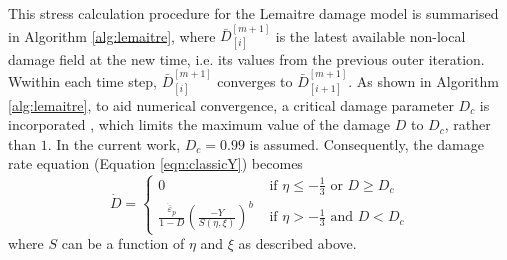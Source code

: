 \documentclass[sn-mathphys,Numbered]{sn-jnl}%
\begin{document}




This stress calculation procedure for the Lemaitre damage model is summarised in Algorithm \ref{alg:lemaitre}, where $\bar{D}^{[m+1]}_{[i]}$ is the latest available non-local damage field at the new time, i.e. its values from the previous outer iteration.
Wwithin each time step, $\bar{D}^{[m+1]}_{[i]}$ converges to $\bar{D}^{[m+1]}_{[i+1]}$.
As shown in Algorithm \ref{alg:lemaitre}, to aid numerical convergence, a critical damage parameter $D_c$ is incorporated \cite{lemaitre_continuous_1985}, which limits the maximum value of the damage $D$ to $D_c$, rather than $1$.
In the current work, $D_c = 0.99$ is assumed.
Consequently, the damage rate equation (Equation \ref{eqn:classicY}) becomes
\begin{equation} \label{eq:damageLimit} %
	\dot{D} =
	\begin{cases}
		0 & \text { if } \eta \leq -\frac{1}{3} \text{ or } D \geq D_c \\
		\frac{\dot{\bar{\varepsilon}}_p}{1 - D}\left(\frac{-Y}{S(\eta,\xi)}\right)^b 
		& \text { if } \eta>-\frac{1}{3} \text{ and }  D < D_c
	\end{cases}
\end{equation}
where $S$ can be a function of $\eta$ and $\xi$ as described above.
\end{document}
